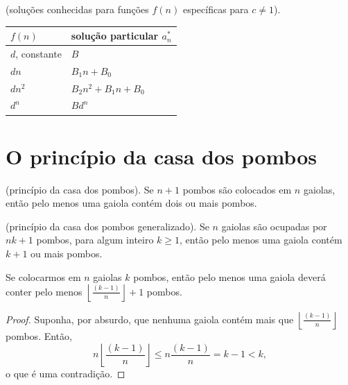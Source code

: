 \documentclass{article}
\begin{document}
\begin{prop} (soluções conhecidas para funções \(f(n)\) específicas para \(c\neq 1\)). \vspace{2mm}\newline
    \begin{tabular}[c]{ll}
        \(f(n)\) & \textup{solução particular} \(a^{*}_{n}\) \\
        \hline
        \(d\)\textup{, constante} & \(B\) \\
        \(dn\) & \(B_1n + B_0\) \\
        \(dn^2\) & \(B_2 n^2 + B_1 n + B_0\) \\
        \(d^n\) & \(B d^n\) \\
    \end{tabular}
\end{prop}

\section{O princípio da casa dos pombos}

\begin{thm} (princípio da casa dos pombos).
    Se \(n+1\) pombos são colocados em \(n\) gaiolas, então pelo menos uma gaiola contém dois ou mais pombos.
\end{thm}

\begin{thm} (princípio da casa dos pombos generalizado).
    Se \(n\) gaiolas são ocupadas por \(nk+1\) pombos, para algum inteiro \(k \geq 1\), então pelo menos uma gaiola contém \(k+1\) ou mais pombos.
\end{thm}

\begin{thm}\label{eq:pcp}
    Se colocarmos em \(n\) gaiolas \(k\) pombos, então pelo menos uma gaiola deverá conter pelo menos \(\displaystyle \left \lfloor \frac{(k-1)}{n} \right \rfloor + 1\) pombos.
\end{thm}

\begin{proof}
    Suponha, por absurdo, que nenhuma gaiola contém mais que \(\displaystyle \left \lfloor \frac{(k-1)}{n} \right \rfloor\) pombos. Então,
    \begin{equation*}
        n \left \lfloor \frac{(k-1)}{n} \right \rfloor \leq n \frac{(k-1)}{n} = k-1 < k,
    \end{equation*}
    \noindent o que é uma contradição.
\end{proof}
\end{document}
